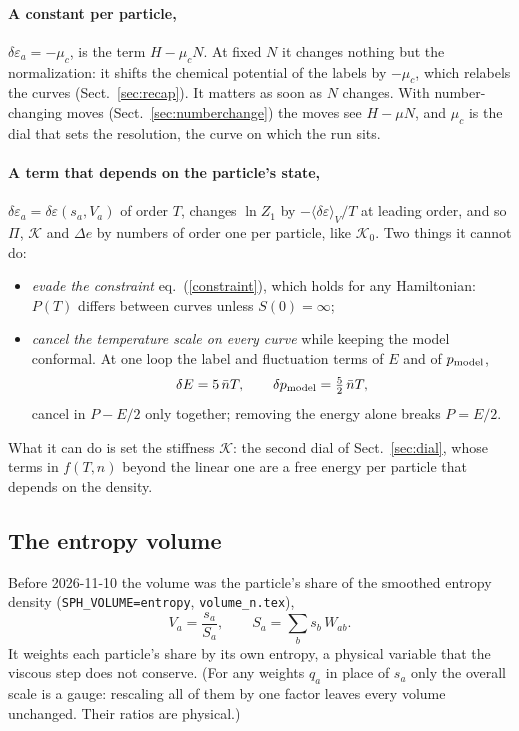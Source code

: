 \documentclass[11pt,aps,preprint,nofootinbib,superscriptaddress,tightenlines]{revtex4-2}
\newcommand{\avg}[1]{\langle #1\rangle}
\def\st{\begin{equation}}
\def\stp{\end{equation}}
\def\Eq#1{eq.~(\ref{#1})}
\def\Sect#1{Sect.~\ref{#1}}
\let\oldparagraph\paragraph
\renewcommand{\paragraph}{\par\bigskip\oldparagraph}
\begin{document}
\paragraph{A constant per particle,} $\delta\varepsilon_a=-\mu_c$, is the term $H-\mu_cN$.  At fixed $N$ it changes nothing but the normalization: it shifts the
chemical potential of the labels by $-\mu_c$, which relabels the curves (\Sect{sec:recap}).  It matters as soon as $N$ changes.  With number-changing moves
(\Sect{sec:numberchange}) the moves see $H-\mu N$, and $\mu_c$ is the dial that sets the resolution, the curve on which the run sits.

\paragraph{A term that depends on the particle's state,} $\delta\varepsilon_a=\delta\varepsilon(s_a,V_a)$ of order $T$, changes $\ln Z_1$ by $-\avg{\delta\varepsilon}_V/T$
at leading order, and so $\Pi$, $\mathcal K$ and $\Delta e$ by numbers of order one per particle, like $\mathcal K_0$.  Two things it cannot do:
\begin{itemize}
\item \emph{evade the constraint} \Eq{constraint}, which holds for any Hamiltonian: $P(T)$ differs between curves unless $S(0)=\infty$;
\item \emph{cancel the temperature scale on every curve} while keeping the model conformal.  At one loop the label and fluctuation terms of $E$ and of $p_{\rm model}$,
  \st
  \delta E=5\,\bar nT,\qquad \delta p_{\rm model}=\tfrac52\,\bar nT ,
  \stp
  cancel in $P-E/2$ only together; removing the energy alone breaks $P=E/2$.
\end{itemize}
What it can do is set the stiffness $\mathcal K$: the second dial of \Sect{sec:dial}, whose terms in $f(T,n)$ beyond the linear one are a free energy per
particle that depends on the density.

\subsection{The entropy volume}

Before 2026-11-10 the volume was the particle's share of the smoothed entropy density (\texttt{SPH\_VOLUME=entropy}, \texttt{volume\_n.tex}),
\st
V_a=\frac{s_a}{S_a},\qquad S_a=\sum_bs_b\,W_{ab} .
\stp
It weights each particle's share by its own entropy, a physical variable that the viscous step does not conserve.  (For any weights $q_a$ in place of $s_a$ only the overall scale
is a gauge: rescaling all of them by one factor leaves every volume unchanged.  Their ratios are physical.)
\end{document}
